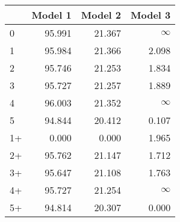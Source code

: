 \begin{tabular}{lrrr}
\toprule
     &   Model 1 &   Model 2 &   Model 3 \\
\midrule
 0   &    \num{95.991} &    \num{21.367} &  $\infty$    \\
 1   &    \num{95.984} &    \num{21.366} &     \num{2.098} \\
 2   &    \num{95.746} &    \num{21.253} &     \num{1.834} \\
 3   &    \num{95.727} &    \num{21.257} &     \num{1.889} \\
 4   &    \num{96.003} &    \num{21.352} &  $\infty$    \\
 5   &    \num{94.844} &    \num{20.412} &     \num{0.107} \\
 1+  &     \num{0.000} &     \num{0.000} &     \num{1.965} \\
 2+  &    \num{95.762} &    \num{21.147} &     \num{1.712} \\
 3+  &    \num{95.647} &    \num{21.108} &     \num{1.763} \\
 4+  &    \num{95.727} &    \num{21.254} &  $\infty$    \\
 5+  &    \num{94.814} &    \num{20.307} &     \num{0.000} \\
\bottomrule
\end{tabular}